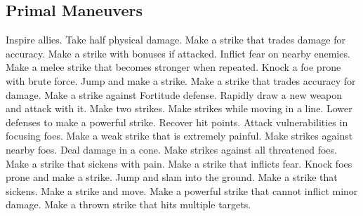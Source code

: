 \subsection{Primal Maneuvers}\label{Primal Maneuvers}
\begin{spelllist}
 Inspire allies.
 Take half physical damage.
 Make a strike that trades damage for accuracy.
 Make a strike with bonuses if attacked.
 Inflict fear on nearby enemies.
 Make a melee strike that becomes stronger when repeated.
 Knock a foe prone with brute force.
 Jump and make a strike.
 Make a strike that trades accuracy for damage.
 Make a strike against Fortitude defense.
 Rapidly draw a new weapon and attack with it.
 Make two strikes.
 Make strikes while moving in a line.
 Lower defenses to make a powerful strike.
 Recover hit points.
 Attack vulnerabilities in focusing foes.
 Make a weak strike that is extremely painful.
 Make strikes against nearby foes.
 Deal damage in a cone.
 Make strikes against all threatened foes.
 Make a strike that sickens with pain.
 Make a strike that inflicts fear.
 Knock foes prone and make a strike.
 Jump and slam into the ground.
 Make a strike that sickens.
 Make a strike and move.
 Make a powerful strike that cannot inflict minor damage.
 Make a thrown strike that hits multiple targets.
\end{spelllist}



\small
